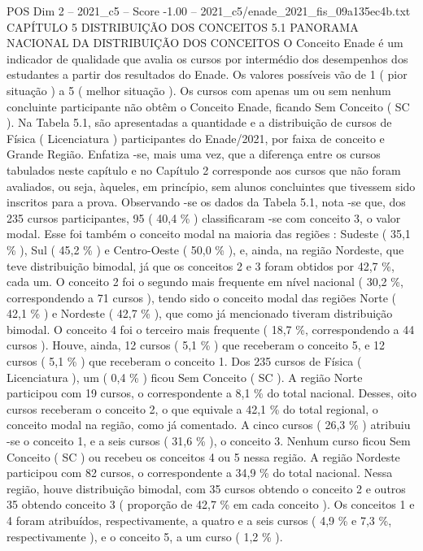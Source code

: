 \begin{textsample}{POS Dim 2 – 2021\_c5 – Score -1.00 – 2021\_c5/enade\_2021\_fis\_09a135ec4b.txt}  \label{ex:f2_pos_293}
CAPÍTULO 5 DISTRIBUIÇÃO DOS CONCEITOS 5.1 PANORAMA NACIONAL DA DISTRIBUIÇÃO DOS CONCEITOS O Conceito Enade é um indicador de qualidade que avalia os cursos por intermédio dos desempenhos dos estudantes a partir dos resultados do Enade.
Os valores possíveis vão de 1 ( pior situação ) a 5 ( melhor situação ).
Os cursos com apenas um ou sem nenhum concluinte participante não obtêm o Conceito Enade, ficando Sem Conceito ( SC ).
Na Tabela 5.1, são apresentadas a quantidade e a distribuição de cursos de Física ( Licenciatura ) participantes do Enade/2021, por faixa de conceito e Grande Região.
Enfatiza -se, mais uma vez, que a diferença entre os cursos tabulados neste capítulo e no Capítulo 2 corresponde aos cursos que não foram avaliados, ou seja, àqueles, em princípio, sem alunos concluintes que tivessem sido inscritos para a prova.
Observando -se os dados da Tabela 5.1, nota -se que, dos 235 cursos participantes, 95 ( 40,4 \% ) classificaram -se com conceito 3, o valor modal.
Esse foi também o conceito modal na maioria das regiões : Sudeste ( 35,1 \% ), Sul ( 45,2 \% ) e Centro-Oeste ( 50,0 \% ), e, ainda, na região Nordeste, que teve distribuição bimodal, já que os conceitos 2 e 3 foram obtidos por 42,7 \%, cada um.
O conceito 2 foi o segundo mais frequente em nível nacional ( 30,2 \%, correspondendo a 71 cursos ), tendo sido o conceito modal das regiões Norte ( 42,1 \% ) e Nordeste ( 42,7 \% ), que como já mencionado tiveram distribuição bimodal.
O conceito 4 foi o terceiro mais frequente ( 18,7 \%, correspondendo a 44 cursos ).
Houve, ainda, 12 cursos ( 5,1 \% ) que receberam o conceito 5, e 12 cursos ( 5,1 \% ) que receberam o conceito 1.
Dos 235 cursos de Física ( Licenciatura ), um ( 0,4 \% ) ficou Sem Conceito ( SC ).
A região Norte participou com 19 cursos, o correspondente a 8,1 \% do total nacional.
Desses, oito cursos receberam o conceito 2, o que equivale a 42,1 \% do total regional, o conceito modal na região, como já comentado.
A cinco cursos ( 26,3 \% ) atribuiu -se o conceito 1, e a seis cursos ( 31,6 \% ), o conceito 3.
Nenhum curso ficou Sem Conceito ( SC ) ou recebeu os conceitos 4 ou 5 nessa região.
A região Nordeste participou com 82 cursos, o correspondente a 34,9 \% do total nacional.
Nessa região, houve distribuição bimodal, com 35 cursos obtendo o conceito 2 e outros 35 obtendo conceito 3 ( proporção de 42,7 \% em cada conceito ).
Os conceitos 1 e 4 foram atribuídos, respectivamente, a quatro e a seis cursos ( 4,9 \% e 7,3 \%, respectivamente ), e o conceito 5, a um curso ( 1,2 \% ).

\end{textsample}
